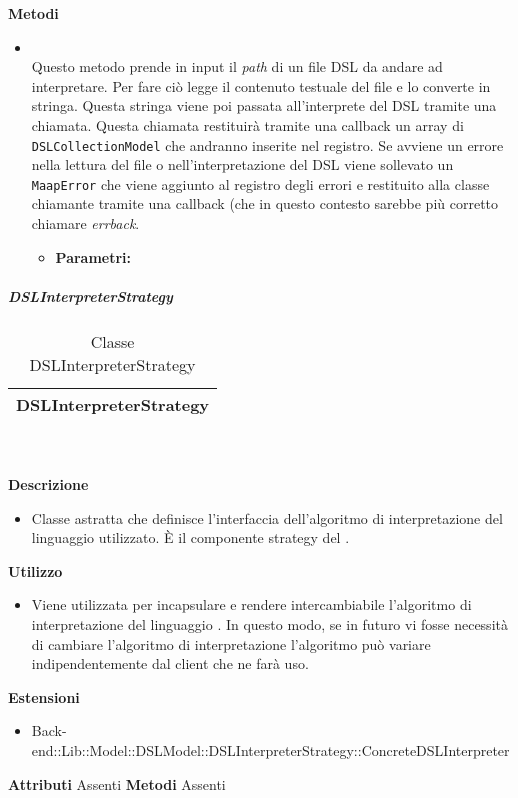\textbf{Metodi}
\begin{itemize}
\item[] \textbf{} \\ Questo metodo prende in input il \textit{path} di un file DSL da andare ad interpretare. Per fare ciò legge il contenuto testuale del file e lo converte in stringa. Questa stringa viene poi passata all'interprete del DSL tramite una chiamata. Questa chiamata restituirà tramite una callback un array di \texttt{DSLCollectionModel} che andranno inserite nel registro. Se avviene un errore nella lettura del file o nell'interpretazione del DSL viene sollevato un \texttt{MaapError} che viene aggiunto al registro degli errori e restituito alla classe chiamante tramite una callback (che in questo contesto sarebbe più corretto chiamare \textit{errback}.
\begin{itemize}\addtolength{\itemsep}{-0.5\baselineskip}
\item[] \textbf{Parametri:}
\end{itemize}
\end{itemize}

			\subparagraph{DSLInterpreterStrategy} 
\begin{table}[ht]
\begin{center}
\bgroup
	\setlength{\arrayrulewidth}{0.6mm}
	\def\arraystretch{1}
		\begin{tabular}{ | p{12cm} | }
				\hline  
					\centerline{\textbf{DSLInterpreterStrategy}}
		\\ \hline 
				\hline
				\hline
		
		\end{tabular}
\egroup
\caption{Classe DSLInterpreterStrategy}
\end{center}
\end{table} \textbf{\\ \\ Descrizione}
\begin{itemize}
\item[] Classe astratta che definisce l'interfaccia dell'algoritmo di interpretazione del linguaggio  utilizzato. È il componente strategy del  .
\end{itemize} 
\textbf{Utilizzo}
\begin{itemize}
\item[] Viene utilizzata per incapsulare e rendere intercambiabile l'algoritmo di interpretazione del linguaggio . In questo modo, se in futuro vi fosse necessità di cambiare l'algoritmo di interpretazione l'algoritmo può variare indipendentemente dal client che ne farà uso.
\end{itemize}
\textbf{Estensioni}
\begin{itemize}
\item{Back-end::Lib::Model::DSLModel::DSLInterpreterStrategy::ConcreteDSLInterpreter}
\end{itemize}
\textbf{Attributi}
Assenti
\textbf{Metodi}
Assenti

